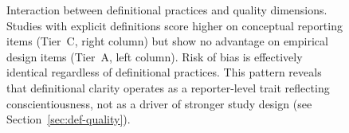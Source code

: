 \begin{figure}[!h]
\caption{Interaction between definitional practices and quality dimensions. Studies with explicit definitions score higher on conceptual reporting items (Tier~C, right column) but show no advantage on empirical design items (Tier~A, left column). Risk of bias is effectively identical regardless of definitional practices. This pattern reveals that definitional clarity operates as a reporter-level trait reflecting conscientiousness, not as a driver of stronger study design (see Section~\ref{sec:def-quality}).}
\label{fig:definitional-quality-interaction}
\end{figure}
